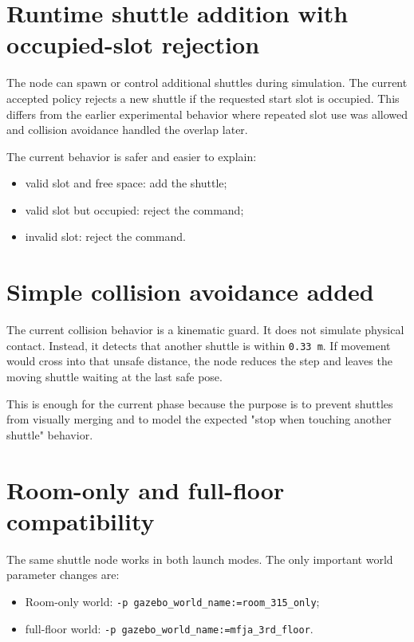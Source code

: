 \documentclass[12pt,a4paper]{report}
\begin{document}
\section{Runtime shuttle addition with occupied-slot rejection}

The node can spawn or control additional shuttles during simulation. The
current accepted policy rejects a new shuttle if the requested start slot is
occupied. This differs from the earlier experimental behavior where repeated
slot use was allowed and collision avoidance handled the overlap later.

The current behavior is safer and easier to explain:

\begin{itemize}
\item valid slot and free space: add the shuttle;
\item valid slot but occupied: reject the command;
\item invalid slot: reject the command.
\end{itemize}

\section{Simple collision avoidance added}

The current collision behavior is a kinematic guard. It does not simulate
physical contact. Instead, it detects that another shuttle is within
\texttt{0.33 m}. If movement would cross into that unsafe distance, the node
reduces the step and leaves the moving shuttle waiting at the last safe pose.

This is enough for the current phase because the purpose is to prevent shuttles
from visually merging and to model the expected "stop when touching another
shuttle" behavior.

\section{Room-only and full-floor compatibility}

The same shuttle node works in both launch modes. The only important world
parameter changes are:

\begin{itemize}
\item Room-only world: \texttt{-p gazebo\_world\_name:=room\_315\_only};
\item full-floor world: \texttt{-p gazebo\_world\_name:=mfja\_3rd\_floor}.
\end{itemize}
\end{document}

